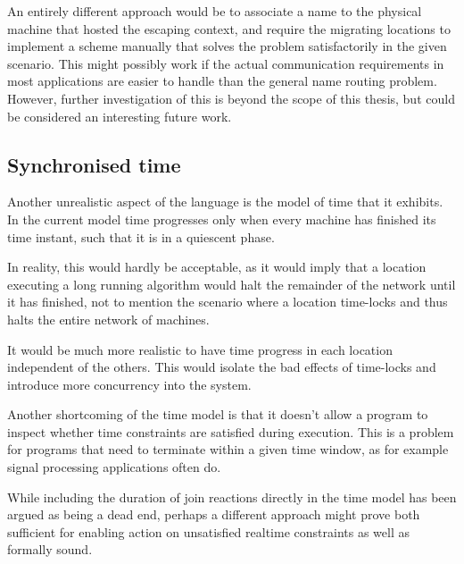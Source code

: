 \vspace{1em}

An entirely different approach would be to associate a name to the physical
machine that hosted the escaping context, and require the migrating locations to
implement a scheme manually that solves the problem satisfactorily in the given
scenario. This might possibly work if the actual communication requirements in
most applications are easier to handle than the general name routing problem.
However, further investigation of this is beyond the scope of this thesis, but
could be considered an interesting future work.

\subsection*{Synchronised time}

Another unrealistic aspect of the language is the model of time that it
exhibits. In the current model time progresses only when every machine has
finished its time instant, such that it is in a quiescent phase.

In reality, this would hardly be acceptable, as it would imply that a location
executing a long running algorithm would halt the remainder of the network until
it has finished, not to mention the scenario where a location time-locks and thus
halts the entire network of machines.

It would be much more realistic to have time progress in each location
independent of the others. This would isolate the bad effects of time-locks and
introduce more concurrency into the system.

\vspace{1em}

Another shortcoming of the time model is that it doesn't allow a program to
inspect whether time constraints are satisfied during execution.
This is a problem for programs that need to terminate within a given time
window, as for example signal processing applications often do.

While including the duration of join reactions directly in the time model has
been argued as being a dead end, perhaps a different approach might prove both
sufficient for enabling action on unsatisfied realtime constraints as well as
formally sound.

%
%
%

